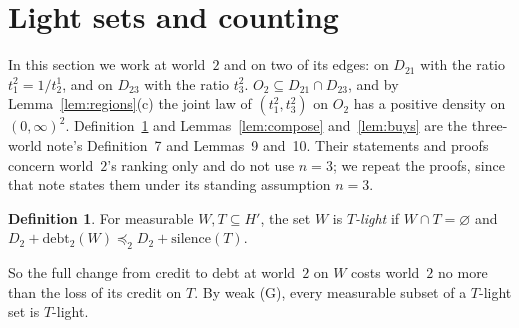 \documentclass[11pt]{article}
\theoremstyle{definition}\newtheorem{definition}[theorem]{Definition}
\theoremstyle{remark}\newtheorem{remark}[theorem]{Remark}
\newcommand{\debt}{\mathrm{debt}}
\newcommand{\sil}{\mathrm{silence}}
\begin{document}
\section{Light sets and counting}\label{sec:counting}

In this section we work at world~$2$ and on two of its edges: on $D_{21}$
with the ratio $t^2_1=1/t^1_2$, and on $D_{23}$ with the ratio $t^2_3$.
$O_2\subseteq D_{21}\cap D_{23}$, and by Lemma~\ref{lem:regions}(c) the
joint law of $(t^2_1,t^2_3)$ on $O_2$ has a positive density on
$(0,\infty)^2$. Definition~\ref{def:light} and
Lemmas~\ref{lem:compose} and~\ref{lem:buys} are the three-world note's
Definition~7 and Lemmas~9 and~10. Their statements and proofs concern
world~$2$'s ranking only and do not use $n=3$; we repeat the proofs, since
that note states them under its standing assumption $n=3$.

\begin{definition}\label{def:light}
For measurable $W,T\subseteq H'$, the set $W$ is \emph{$T$-light} if
$W\cap T=\varnothing$ and $D_2+\debt_2(W)\preceq_2D_2+\sil(T)$.
\end{definition}

So the full change from credit to debt at world~$2$ on $W$ costs world~$2$
no more than the loss of its credit on $T$. By weak (G), every measurable
subset of a $T$-light set is $T$-light.
\end{document}
